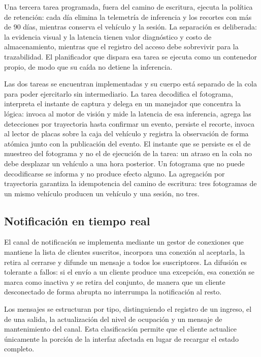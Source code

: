 Una tercera tarea programada, fuera del camino de escritura, ejecuta la política
de retención: cada día elimina la telemetría de inferencia y los recortes con más
de $90$ días, mientras conserva el vehículo y la sesión. La separación es
deliberada: la evidencia visual y la latencia tienen valor diagnóstico y costo de
almacenamiento, mientras que el registro del acceso debe sobrevivir para la
trazabilidad. El planificador que dispara esa tarea se ejecuta como un contenedor
propio, de modo que su caída no detiene la inferencia.

Las dos tareas se encuentran implementadas y su cuerpo está separado de la cola
para poder ejercitarlo sin intermediario. La tarea decodifica el fotograma,
interpreta el instante de captura y delega en un manejador que concentra la
lógica: invoca al motor de visión y mide la latencia de esa inferencia, agrega las
detecciones por trayectoria hasta confirmar un evento, persiste el recorte,
invoca al lector de placas sobre la caja del vehículo y registra la observación de
forma atómica junto con la publicación del evento. El instante que se persiste es
el de muestreo del fotograma y no el de ejecución de la tarea: un atraso en la
cola no debe desplazar un vehículo a una hora posterior. Un fotograma que no
puede decodificarse se informa y no produce efecto alguno. La agregación por
trayectoria garantiza la idempotencia del camino de escritura: tres fotogramas de
un mismo vehículo producen un vehículo y una sesión, no tres.

\subsection{Notificación en tiempo real}

El canal de notificación se implementa mediante un gestor de conexiones que
mantiene la lista de clientes suscritos, incorpora una conexión al aceptarla,
la retira al cerrarse y difunde un mensaje a todos los suscriptores. La difusión
es tolerante a fallos: si el envío a un cliente produce una excepción, esa
conexión se marca como inactiva y se retira del conjunto, de manera que un
cliente desconectado de forma abrupta no interrumpa la notificación al resto.

Los mensajes se estructuran por tipo, distinguiendo el registro de un ingreso, el
de una salida, la actualización del nivel de ocupación y un mensaje de
mantenimiento del canal. Esta clasificación permite que el cliente actualice
únicamente la porción de la interfaz afectada en lugar de recargar el estado
completo.

